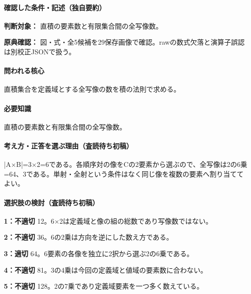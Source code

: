 \paragraph{確認した条件・記述（独自要約）}\mbox{}\par

\noindent\textbf{判断対象：} 直積の要素数と有限集合間の全写像数。\par

\noindent\textbf{原典確認：} 図・式・全5候補を29保存画像で確認。rawの数式欠落と演算子誤認は別校正JSONで扱う。\par

\paragraph{問われる核心} 直積集合を定義域とする全写像の数を積の法則で求める。

\paragraph{必要知識} 直積の要素数と有限集合間の全写像数。

\paragraph{考え方・正答を選ぶ理由（査読待ち初稿）} |A×B|=3×2=\allowbreak{}6である。各順序対の像をCの2要素から選ぶので、全写像は2の6乗=64、3である。単射・全射という条件はなく同じ像を複数の要素へ割り当ててよい。

\paragraph{選択肢の検討（査読待ち初稿）}\mbox{}\par

\noindent\textbf{1：不適切} 12。6×2は定義域と像の組の総数であり写像数ではない。\par

\noindent\textbf{2：不適切} 36。6の2乗は方向を逆にした数え方である。\par

\noindent\textbf{3：適切} 64。6要素の各像を独立に2択から選ぶ2の6乗である。\par

\noindent\textbf{4：不適切} 81。3の4乗は今回の定義域と値域の要素数に合わない。\par

\noindent\textbf{5：不適切} 128。2の7乗であり定義域要素を一つ多く数えている。\par

